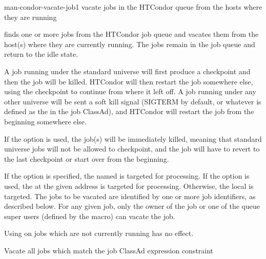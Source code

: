 \begin{ManPage}{}{man-condor-vacate-job}{1}
{vacate jobs in the HTCondor queue from the hosts where they are running}

\Synopsis {}
\ToolArgsBase

\ToolLocate
{}
\ToolJobs
\Bar{}  \Dots

\ToolLocate
{}
\ToolAll

\Description

 finds one or more jobs from the HTCondor job queue
and vacates them from the host(s) where they are currently running.  
The jobs remain in the job queue and return to the idle state.

A job running under the standard universe will first produce a
checkpoint and then the job will be killed.
HTCondor will then restart the job somewhere else, using the checkpoint
to continue from where it left off.
A job running under any other universe will be sent a soft kill signal
(SIGTERM by default, or whatever is defined as the 
in the job ClassAd), and HTCondor will restart the job from the
beginning somewhere else. 

If the  option is used, the job(s) will be immediately killed,
meaning that standard universe jobs will not be allowed to checkpoint,
and the job will have to revert to the last checkpoint or start over
from the beginning.

If the  option is specified, the named  is
targeted for processing.  
If the  option is used, the  at the given
address is targeted for processing.  
Otherwise, the local  is targeted.
The jobs to be vacated are identified by one or more job identifiers, as
described below.
For any given job, only the owner of the job or one of the queue super users
(defined by the  macro) can vacate the job.

Using  on jobs which are not currently running has
no effect.

\begin{Options}
	\ToolArgsBaseDesc
	\ToolLocateDesc
	 {Vacate all jobs which match
	                the job ClassAd expression constraint}
\end{Options}


\end{ManPage}
